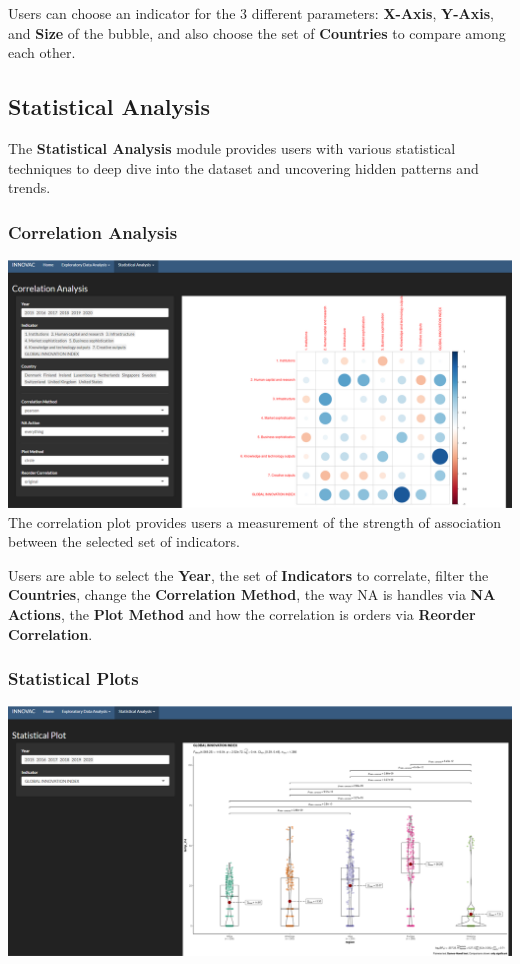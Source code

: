 \documentclass[
]{article}
\begin{document}
Users can choose an indicator for the 3 different parameters:
\textbf{X-Axis}, \textbf{Y-Axis}, and \textbf{Size} of the bubble, and
also choose the set of \textbf{Countries} to compare among each other.

\hypertarget{statistical-analysis}{%
\subsection{Statistical Analysis}\label{statistical-analysis}}

The \textbf{Statistical Analysis} module provides users with various
statistical techniques to deep dive into the dataset and uncovering
hidden patterns and trends.

\hypertarget{correlation-analysis}{%
\subsubsection{Correlation Analysis}\label{correlation-analysis}}

\includegraphics{./images/correlation.png} The correlation plot provides
users a measurement of the strength of association between the selected
set of indicators.

Users are able to select the \textbf{Year}, the set of
\textbf{Indicators} to correlate, filter the \textbf{Countries}, change
the \textbf{Correlation Method}, the way NA is handles via \textbf{NA
Actions}, the \textbf{Plot Method} and how the correlation is orders via
\textbf{Reorder Correlation}.

\hypertarget{statistical-plots}{%
\subsubsection{Statistical Plots}\label{statistical-plots}}

\includegraphics{./images/stats.png}
\end{document}
